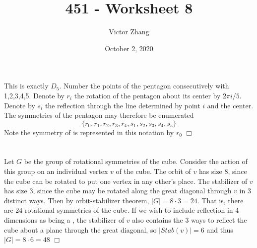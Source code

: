 \documentclass{article}
\title{451 - Worksheet 8}
\author{Victor Zhang}
\date{October 2, 2020}
\begin{document}
\maketitle

\section{}
This is exactly $D_5$. Number the points of the pentagon consecutively with 1,2,3,4,5. Denote by $r_i$ the rotation of the pentagon about its center by $2\pi i/5$. Denote by $s_i$ the reflection through the line determined by point $i$ and the center. The symmetries of the pentagon may therefore be enumerated
$$\{r_0, r_1, r_2, r_3, r_4, s_1, s_2, s_3, s_4, s_5\}$$
Note the symmetry of  is represented in this notation by $r_0$ $\Box$

\section{}
Let $G$ be the group of rotational symmetries of the cube. Consider the action of this group on an individual vertex $v$ of the cube. The orbit of $v$ has size 8, since the cube can be rotated to put one vertex in any other's place. The stabilizer of $v$ has size 3, since the cube may be rotated along the great diagonal through $v$ in 3 distinct ways. Then by orbit-stabilizer theorem, $|G| = 8 \cdot 3 = 24$. That is, there are 24 rotational symmetries of the cube. If we wish to include reflection in 4 dimensions as being a , the stabilizer of $v$ also contains the 3 ways to reflect the cube about a plane through the great diagonal, so $|Stab(v)| = 6$ and thus $|G| = 8\cdot 6 = 48$ $\Box$
\end{document}
